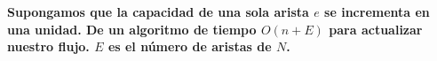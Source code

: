 \textbf{
    Supongamos que la capacidad de una sola arista $e$ se incrementa en una unidad. De un 
    algoritmo de tiempo $O(n+E)$ para actualizar nuestro flujo. $E$ es el número de aristas 
    de $N$.
}\vspace{.2cm}
\textcolor{bibi}{}
\begin{quote}
\end{quote}